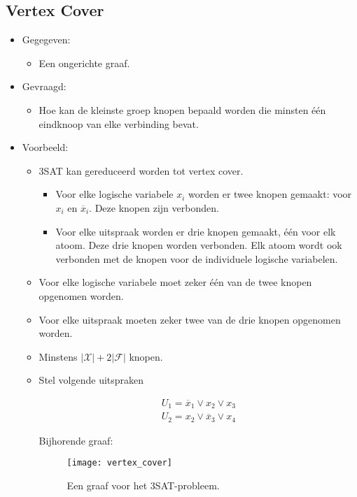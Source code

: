 \subsection{Vertex Cover}
\begin{itemize}
    \item Gegegeven:
    \begin{itemize}
        \item Een ongerichte graaf.
    \end{itemize}
    \item Gevraagd:
    \begin{itemize}
        \item Hoe kan de kleinste groep knopen bepaald worden die minsten één eindknoop van elke verbinding bevat.
    \end{itemize}

    \item Voorbeeld:
    \begin{itemize}
        \item 3SAT kan gereduceerd worden tot vertex cover.
        \begin{itemize}
            \item Voor elke logische variabele $x_i$ worden er twee knopen gemaakt: voor $x_i$ en $\overline{x}_i$. Deze knopen zijn verbonden.
            \item Voor elke uitspraak worden er drie knopen gemaakt, één voor elk atoom. Deze drie knopen worden verbonden. Elk atoom wordt ook verbonden met de knopen voor de individuele logische variabelen.
        \end{itemize}
        \item Voor elke logische variabele moet zeker één van de twee knopen opgenomen worden.
        \item Voor elke uitspraak moeten zeker twee van de drie knopen opgenomen worden.
        \item Minstens $|\mathcal{X}| + 2|\mathcal{F}|$ knopen.
        \item Stel volgende uitspraken 

        \begin{align*}
            U_1 = \overline{x}_1 \vee x_2 \vee x_3 \\
            U_2 = x_2 \vee \overline{x}_3 \vee x_4
        \end{align*}

        Bijhorende graaf:
        \begin{figure}[ht]
            \centering
            \texttt{[image: vertex\_cover]}
            \caption{Een graaf voor het 3SAT-probleem.}
            \label{fig:vertex_cover}
        \end{figure}


\end{itemize}
\end{itemize}
